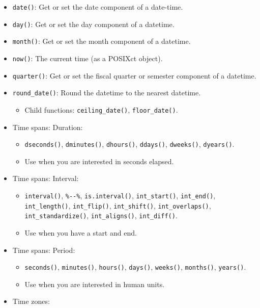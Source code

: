 \documentclass[]{book}
\providecommand{\tightlist}{%
  \setlength{\itemsep}{0pt}\setlength{\parskip}{0pt}}
\theoremstyle{definition}
\theoremstyle{definition}
\theoremstyle{definition}
\theoremstyle{remark}
\begin{document}
\begin{itemize}
\tightlist
\item
  \texttt{date()}: Get or set the date component of a date-time.
\item
  \texttt{day()}: Get or set the day component of a datetime.
\item
  \texttt{month()}: Get or set the month component of a datetime.
\item
  \texttt{now()}: The current time (as a POSIXct object).
\item
  \texttt{quarter()}: Get or set the fiscal quarter or semester
  component of a datetime.
\item
  \texttt{round\_date()}: Round the datetime to the nearest datetime.

  \begin{itemize}
  \tightlist
  \item
    Child functions: \texttt{ceiling\_date()}, \texttt{floor\_date()}.
  \end{itemize}
\item
  Time spans: Duration:

  \begin{itemize}
  \tightlist
  \item
    \texttt{dseconds()}, \texttt{dminutes()}, \texttt{dhours()},
    \texttt{ddays()}, \texttt{dweeks()}, \texttt{dyears()}.
  \item
    Use when you are interested in seconds elapsed.
  \end{itemize}
\item
  Time spans: Interval:

  \begin{itemize}
  \tightlist
  \item
    \texttt{interval()}, \texttt{\%-\/-\%}, \texttt{is.interval()},
    \texttt{int\_start()}, \texttt{int\_end()}, \texttt{int\_length()},
    \texttt{int\_flip()}, \texttt{int\_shift()},
    \texttt{int\_overlaps()}, \texttt{int\_standardize()},
    \texttt{int\_aligns()}, \texttt{int\_diff()}.
  \item
    Use when you have a start and end.
  \end{itemize}
\item
  Time spans: Period:

  \begin{itemize}
  \tightlist
  \item
    \texttt{seconds()}, \texttt{minutes()}, \texttt{hours()},
    \texttt{days()}, \texttt{weeks()}, \texttt{months()},
    \texttt{years()}.
  \item
    Use when you are interested in human units.
  \end{itemize}
\item
  Time zones:


\end{itemize}
\end{document}
